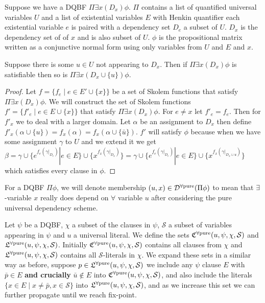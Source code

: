 \documentclass[runningheads]{llncs}
\newcommand{\pathc}[1]{\ensuremath{\mathfrak{C}^{\mbox{\scriptsize \upshape #1}}}\xspace}
\newcommand{\pathl}[1]{\ensuremath{\mathfrak{L}^{\mbox{\scriptsize \upshape #1}}}\xspace}
\newcommand{\pathcpu}{\pathc{$\forall$pure}}
\newcommand{\pathlpu}{\pathl{$\forall$pure}}
\newcommand{\Dz}[1]{\ensuremath{\mathcal{D}^{\mbox{\scriptsize \upshape #1}}}\xspace}
\newcommand{\Drrs}{\Dz{rrs}}
\newcommand{\Dpu}{\Dz{$\forall$pure}}
\begin{document}
	\begin{lemma}
		Suppose we have a DQBF $\Pi\exists x(D_x) \phi$.
		$\Pi$ contains a list of quantified universal variables $U$ and a list of existential variables $E$ with Henkin quantifier each existential variable $e$ is paired with a dependency set $D_e$ a subset of $U$. $D_x$ is the dependency set of of $x$ and is also  subset of $U$.
		$\phi$ is the propositional matrix written as a conjunctive normal form using only variables from $U$ and $E$ and $x$.
		
		Suppose there is some $u\in U$ not appearing to $D_x$. 
		Then if $\Pi\exists x(D_x) \phi$ is satisfiable then so is $\Pi\exists x(D_x\cup\{u\}) \phi$.
	\end{lemma}
	
	\begin{proof}
			Let $f=\{f_e \mid e\in E'\cup \{x\} \}$ be a set of Skolem functions that satisfy $\Pi\exists x(D_x) \phi$. We will construct the set of Skolem functions $f'=\{f'_e \mid e\in E\cup \{x\} \}$ that satisfy $\Pi\exists x(D_x) \phi$.
			For $e\neq x$ let $f'_e=f_e$.
			Then for $f'_x$ we to deal with a larger domain.
			Let $\alpha$ be an assignment to  $D_x$ then define 
			$f'_x(\alpha\cup\{u\})=f_x(\alpha)= f_x(\alpha\cup\{\bar u\})$.
			$f'$ will satisfy $\phi$ because when we have some assignment $\gamma$ to $U$ and we extend it we get $\beta= \gamma\cup \{e^{f_e(\gamma |_{D_e})} | e\in E\}\cup \{x^{f_x(\gamma |_{D_x})}\}= \gamma\cup \{e^{f_e(\gamma |_{D_e})} | e\in E\}\cup \{x^{f_x(\gamma |_{D_x\cup{u}})}\}$ which satisfies every clause in $\phi$.
			
			
	\end{proof}
	
	

	
	
	
	For a DQBF $\Pi\phi$, we will denote membership $(u,x)\in \Dpu(\Pi\phi)$ to mean that $\exists$-variable $x$ really does depend on $\forall$ variable $u$ after considering the pure universal dependency scheme.
	\begin{definition}
		Let $\psi$ be a DQBF, $\chi$ a subset of the clauses in $\psi$, $\mathcal{S}$ a subset of variables appearing in $\psi$ and $u$ a universal literal.
		We define the sets $\pathcpu(u,\psi, \chi, \mathcal{S})$ and  $\pathlpu(u,\psi, \chi, \mathcal{S})$.
		Initially $\pathcpu(u,\psi, \chi, \mathcal{S})$ contains all clauses from $\chi$ and $\pathlpu (u, \psi, \chi, \mathcal{S})$ contains all $\mathcal{S}$-literals in $\chi$.
		We expand these sets in a similar way as before, suppose $p\in \pathlpu (u,\psi, \chi, \mathcal{S})$ we include any $\psi$ clause $E$ with $\bar p\in E$ \textbf{and crucially} $\bar u \notin E$ into $\pathcpu(u,\psi, \chi, \mathcal{S})$, and also include the literals $\{x\in E \mid x\neq \bar p, x \in \mathcal{S}\}$ into
		$\pathlpu (u,\psi, \chi, \mathcal{S})$, and as we increase this set we can further propagate until we reach fix-point.
	\end{definition}
	
\end{document}
